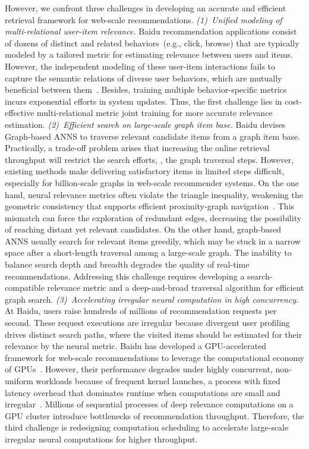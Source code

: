 However, we confront three challenges in developing an accurate and efficient retrieval framework for web-scale recommendations.
\textit{(1)~Unified modeling of multi-relational user-item relevance.} Baidu recommendation applications consist of dozens of distinct and related behaviors~(e.g., click, browse) that are typically modeled by a tailored metric for estimating relevance between users and items. However, the independent modeling of these user-item interactions fails to capture the semantic relations of diverse user behaviors, which are mutually beneficial between them~\cite{tan2020fast}. Besides, training multiple behavior-specific metrics incurs exponential efforts in system updates. Thus, the first challenge lies in cost-effective multi-relational metric joint training for more accurate relevance estimation.
\textit{(2)~Efficient search on large-scale graph item base.} Baidu devises Graph-based ANNS to traverse relevant candidate items from a graph item base. Practically, a trade-off problem arises that increasing the online retrieval throughput will restrict the search efforts, \ie, the graph traversal steps. However, existing methods make delivering satisfactory items in limited steps difficult, especially for billion-scale graphs in web-scale recommender systems.
On the one hand, neural relevance metrics often violate the triangle inequality, weakening the geometric consistency that supports efficient proximity-graph navigation~\cite{chen2022approximate}. This mismatch can force the exploration of redundant edges, decreasing the possibility of reaching distant yet relevant candidates.
On the other hand, graph-based ANNS usually search for relevant items greedily, which may be stuck in a narrow space after a short-length traversal among a large-scale graph.
The inability to balance search depth and breadth degrades the quality of real-time recommendations. Addressing this challenge requires developing a search-compatible relevance metric and a deep-and-broad traversal algorithm for efficient graph search.
\textit{(3)~Accelerating irregular neural computation in high concurrency.} At Baidu, users raise hundreds of millions of recommendation requests per second. These request executions are irregular because divergent user profiling drives distinct search paths, where the visited items should be estimated for their relevance by the neural metric. Baidu has developed a GPU-accelerated framework for web-scale recommendations to leverage the computational economy of GPUs~\cite{liu2022lion}. However, their performance degrades under highly concurrent, non-uniform workloads because of frequent kernel launches, a process with fixed latency overhead that dominates runtime when computations are small and irregular~\cite{el2016klap}. Millions of sequential processes of deep relevance computations on a GPU cluster introduce bottlenecks of recommendation throughput. Therefore, the third challenge is redesigning computation scheduling to accelerate large-scale irregular neural computations for higher throughput.

